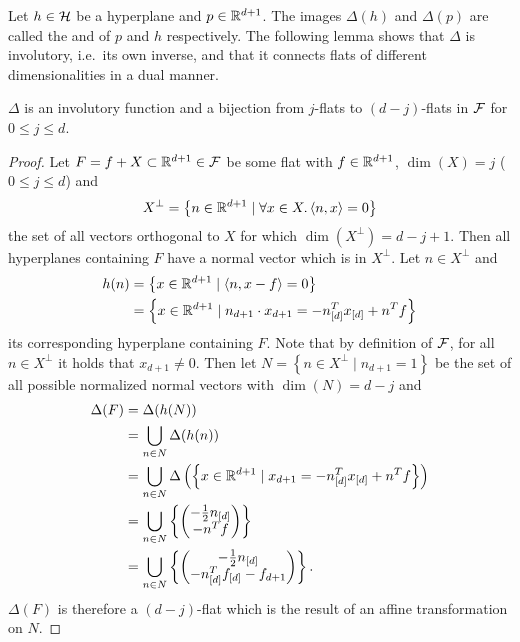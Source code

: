 Let $h \in \mathcal{H}$ be a hyperplane and $p \in \mathbb{R}^{d+1}$. The images $\Delta(h)$ and $\Delta(p)$ are called the  and  of $p$ and $h$ respectively.
The following lemma shows that $\Delta$ is involutory, i.e.~its own inverse, and that it connects flats of different dimensionalities in a dual manner.
\begin{lemma}
    \label{lem:deltainvolutory}
    $\Delta$ is an involutory function and a bijection from $j$-flats to $(d-j)$-flats in $\mathcal{F}$ for $0 \leq j \leq d$.
\end{lemma}
\begin{proof}
    Let $F = f + X \subset \mathbb{R}^{d+1} \in \mathcal{F}$ be some flat with $f \in \mathbb{R}^{d+1}$, $\dim(X) = j$ ($0 \leq j \leq d$) and
    \begin{align}
        X^\bot = \left\{ n \in \mathbb{R}^{d+1} \mid \forall x \in X. \left\langle n, x \right\rangle = 0 \right\}
    \end{align}
    the set of all vectors orthogonal to $X$ for which $\dim(X^\bot) = d - j + 1$.
    Then all hyperplanes containing $F$ have a normal vector which is in $X^\bot$.
    Let $n \in X^\bot$ and
    \begin{align}
        h(n) &= \left\{x \in \mathbb{R}^{d+1} \mid \left\langle n, x - f \right\rangle = 0\right\}\\
        &= \left\{ x \in \mathbb{R}^{d+1} \mid n_{d+1} \cdot x_{d+1} = -n_{[d]}^Tx_{[d]} + n^Tf \right\}
    \end{align}
    its corresponding hyperplane containing $F$.
    Note that by definition of $\mathcal{F}$, for all $n \in X^\bot$ it holds that $x_{d+1} \neq 0$.
    Then let $N = \left\{ n \in X^\bot \mid n_{d+1} = 1 \right\}$ be the set of all possible normalized normal vectors with $\dim(N) = d - j$ and
    \begin{align}
        \Delta(F) &= \Delta(h(N))\\
        &= \bigcup_{n \in N} \Delta(h(n)) \\
        &= \bigcup_{n \in N} \Delta \left( \left\{ x \in \mathbb{R}^{d+1} \mid x_{d+1} = -n_{[d]}^Tx_{[d]} + n^Tf \right\} \right) \\
        &= \bigcup_{n \in N} \left\{ \begin{pmatrix} -\frac{1}{2} n_{[d]}\\ - n^T f \end{pmatrix} \right\} \\
        &= \bigcup_{n \in N} \left\{ \begin{pmatrix} -\frac{1}{2} n_{[d]}\\ - n_{[d]}^T f_{[d]} - f_{d+1} \end{pmatrix} \right\}.
    \end{align}
    $\Delta(F)$ is therefore a $(d - j)$-flat which is the result of an affine transformation on $N$.


\end{proof}
